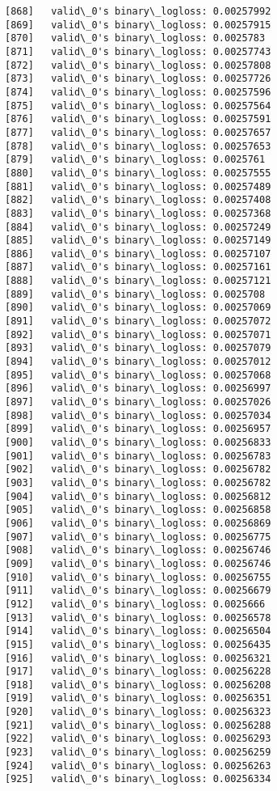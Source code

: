 \documentclass[11pt]{article}
\begin{document}
\begin{Verbatim}[commandchars=\\\{\}]
[868]	valid\_0's binary\_logloss: 0.00257992
[869]	valid\_0's binary\_logloss: 0.00257915
[870]	valid\_0's binary\_logloss: 0.0025783
[871]	valid\_0's binary\_logloss: 0.00257743
[872]	valid\_0's binary\_logloss: 0.00257808
[873]	valid\_0's binary\_logloss: 0.00257726
[874]	valid\_0's binary\_logloss: 0.00257596
[875]	valid\_0's binary\_logloss: 0.00257564
[876]	valid\_0's binary\_logloss: 0.00257591
[877]	valid\_0's binary\_logloss: 0.00257657
[878]	valid\_0's binary\_logloss: 0.00257653
[879]	valid\_0's binary\_logloss: 0.0025761
[880]	valid\_0's binary\_logloss: 0.00257555
[881]	valid\_0's binary\_logloss: 0.00257489
[882]	valid\_0's binary\_logloss: 0.00257408
[883]	valid\_0's binary\_logloss: 0.00257368
[884]	valid\_0's binary\_logloss: 0.00257249
[885]	valid\_0's binary\_logloss: 0.00257149
[886]	valid\_0's binary\_logloss: 0.00257107
[887]	valid\_0's binary\_logloss: 0.00257161
[888]	valid\_0's binary\_logloss: 0.00257121
[889]	valid\_0's binary\_logloss: 0.0025708
[890]	valid\_0's binary\_logloss: 0.00257069
[891]	valid\_0's binary\_logloss: 0.00257072
[892]	valid\_0's binary\_logloss: 0.00257071
[893]	valid\_0's binary\_logloss: 0.00257079
[894]	valid\_0's binary\_logloss: 0.00257012
[895]	valid\_0's binary\_logloss: 0.00257068
[896]	valid\_0's binary\_logloss: 0.00256997
[897]	valid\_0's binary\_logloss: 0.00257026
[898]	valid\_0's binary\_logloss: 0.00257034
[899]	valid\_0's binary\_logloss: 0.00256957
[900]	valid\_0's binary\_logloss: 0.00256833
[901]	valid\_0's binary\_logloss: 0.00256783
[902]	valid\_0's binary\_logloss: 0.00256782
[903]	valid\_0's binary\_logloss: 0.00256782
[904]	valid\_0's binary\_logloss: 0.00256812
[905]	valid\_0's binary\_logloss: 0.00256858
[906]	valid\_0's binary\_logloss: 0.00256869
[907]	valid\_0's binary\_logloss: 0.00256775
[908]	valid\_0's binary\_logloss: 0.00256746
[909]	valid\_0's binary\_logloss: 0.00256746
[910]	valid\_0's binary\_logloss: 0.00256755
[911]	valid\_0's binary\_logloss: 0.00256679
[912]	valid\_0's binary\_logloss: 0.0025666
[913]	valid\_0's binary\_logloss: 0.00256578
[914]	valid\_0's binary\_logloss: 0.00256504
[915]	valid\_0's binary\_logloss: 0.00256435
[916]	valid\_0's binary\_logloss: 0.00256321
[917]	valid\_0's binary\_logloss: 0.00256228
[918]	valid\_0's binary\_logloss: 0.00256208
[919]	valid\_0's binary\_logloss: 0.00256351
[920]	valid\_0's binary\_logloss: 0.00256323
[921]	valid\_0's binary\_logloss: 0.00256288
[922]	valid\_0's binary\_logloss: 0.00256293
[923]	valid\_0's binary\_logloss: 0.00256259
[924]	valid\_0's binary\_logloss: 0.00256263
[925]	valid\_0's binary\_logloss: 0.00256334

\end{Verbatim}
\end{document}
